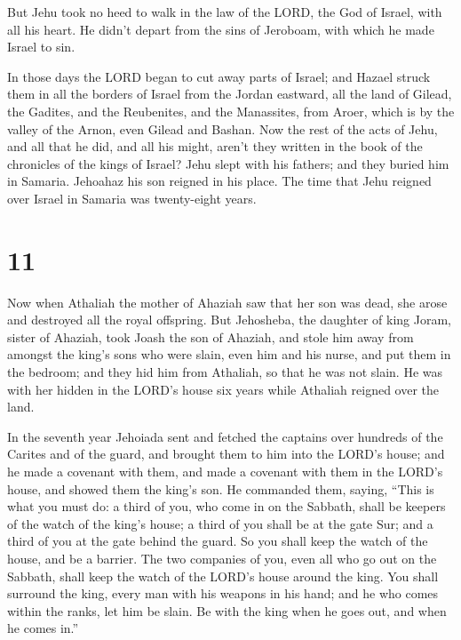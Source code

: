  But Jehu took no heed to walk in the law of the LORD, the
God of Israel, with all his heart. He didn't depart from the sins of
Jeroboam, with which he made Israel to sin.

 In those days the LORD began to cut away parts of Israel;
and Hazael struck them in all the borders of Israel  from
the Jordan eastward, all the land of Gilead, the Gadites, and the
Reubenites, and the Manassites, from Aroer, which is by the valley of
the Arnon, even Gilead and Bashan.  Now the rest of the
acts of Jehu, and all that he did, and all his might, aren't they
written in the book of the chronicles of the kings of Israel?
 Jehu slept with his fathers; and they buried him in
Samaria. Jehoahaz his son reigned in his place.  The time
that Jehu reigned over Israel in Samaria was twenty-eight years.

\hypertarget{section-10}{%
\section{11}\label{section-10}}

 Now when Athaliah the mother of Ahaziah saw that her son
was dead, she arose and destroyed all the royal offspring. 
But Jehosheba, the daughter of king Joram, sister of Ahaziah, took Joash
the son of Ahaziah, and stole him away from amongst the king's sons who
were slain, even him and his nurse, and put them in the bedroom; and
they hid him from Athaliah, so that he was not slain.  He
was with her hidden in the LORD's house six years while Athaliah reigned
over the land.

 In the seventh year Jehoiada sent and fetched the captains
over hundreds of the Carites and of the guard, and brought them to him
into the LORD's house; and he made a covenant with them, and made a
covenant with them in the LORD's house, and showed them the king's son.
 He commanded them, saying, ``This is what you must do: a
third of you, who come in on the Sabbath, shall be keepers of the watch
of the king's house;  a third of you shall be at the gate
Sur; and a third of you at the gate behind the guard. So you shall keep
the watch of the house, and be a barrier.  The two companies
of you, even all who go out on the Sabbath, shall keep the watch of the
LORD's house around the king.  You shall surround the king,
every man with his weapons in his hand; and he who comes within the
ranks, let him be slain. Be with the king when he goes out, and when he
comes in.''

